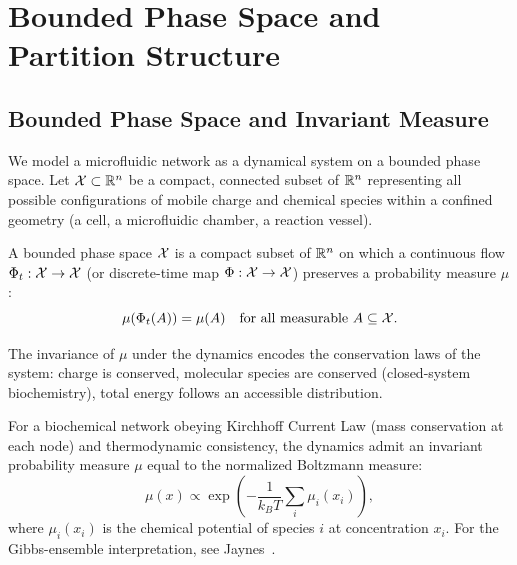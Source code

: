 \section{Bounded Phase Space and Partition Structure}
\label{sec:partition-landscape}

\subsection{Bounded Phase Space and Invariant Measure}
\label{subsec:bounded-phase-space}

We model a microfluidic network as a dynamical system on a bounded phase space. Let $\mathcal{X} \subset \mathbb{R}^n$ be a compact, connected subset of $\mathbb{R}^n$ representing all possible configurations of mobile charge and chemical species within a confined geometry (a cell, a microfluidic chamber, a reaction vessel).

\begin{definition}
\label{def:bounded-phase-space}
A bounded phase space $\mathcal{X}$ is a compact subset of $\mathbb{R}^n$ on which a continuous flow $\Phi_t: \mathcal{X} \to \mathcal{X}$ (or discrete-time map $\Phi: \mathcal{X} \to \mathcal{X}$) preserves a probability measure $\mu$:
\begin{equation}
  \mu(\Phi_t(A)) = \mu(A) \quad \text{for all measurable } A \subseteq \mathcal{X}.
\end{equation}
\end{definition}

The invariance of $\mu$ under the dynamics encodes the conservation laws of the system: charge is conserved, molecular species are conserved (closed-system biochemistry), total energy follows an accessible distribution.

\begin{proposition}
\label{prop:invariant-measure}
For a biochemical network obeying Kirchhoff Current Law (mass conservation at each node) and thermodynamic consistency, the dynamics admit an invariant probability measure $\mu$ equal to the normalized Boltzmann measure:
\begin{equation}
  \mu(x) \propto \exp\left(-\frac{1}{k_B T} \sum_i \mu_i(x_i)\right),
\end{equation}
where $\mu_i(x_i)$ is the chemical potential of species $i$ at concentration $x_i$. For the Gibbs-ensemble interpretation, see Jaynes~\cite{Jaynes1957,Jaynes1965}.
\end{proposition}

